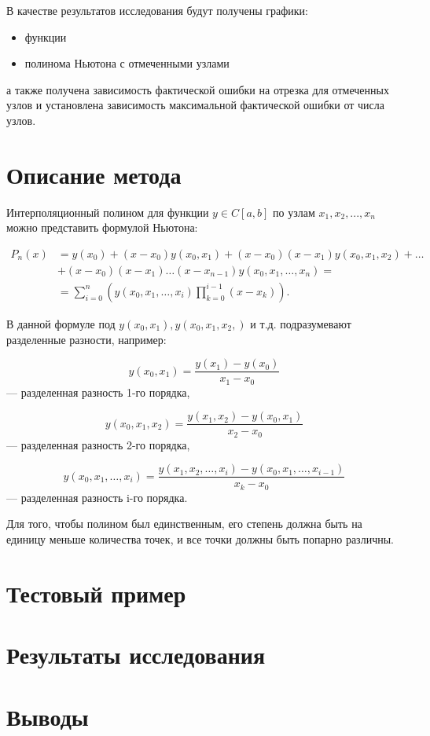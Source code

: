 \documentclass{article}
\begin{document}
В качестве результатов исследования будут получены графики:
\begin{itemize}[label=$\cdot$]
    \item функции
    \item полинома Ньютона с отмеченными узлами
\end{itemize}
а также получена зависимость фактической ошибки на отрезка для отмеченных узлов и установлена зависимость максимальной фактической ошибки от числа узлов.

\section{Описание метода}

Интерполяционный полином для функции $y \in C[a, b]$ по узлам
$x_1, x_2, ... ,\allowbreak x_n$ можно представить формулой Ньютона:

\begin{equation}
\begin{split}
P_n(x) &= y(x_0) + (x - x_0) y(x_0, x_1) + (x - x_0)(x - x_1) y(x_0, x_1, x_2) + \dots \\
& + (x - x_0)(x - x_1) \dots (x - x_{n-1}) y(x_0, x_1, \dots, x_n) = \\
& = \sum_{i=0}^{n} (y(x_0, x_1, \dots, x_i) \prod_{k=0}^{i-1} (x - x_k)).
\end{split}
\end{equation}

В данной формуле под $y(x_0,x_1), y(x_0,x_1,x_2,)$ и т.д. подразумевают разделенные разности, например:

\begin{equation}
y(x_0,x_1) = \frac{y(x_1) - y(x_0)}{x_1-x_0}
\end{equation} --- разделенная разность 1-го порядка,

\begin{equation}
y(x_0,x_1,x_2) = \frac{y(x_1,x_2) - y(x_0,x_1)}{x_2-x_0}
\end{equation} --- разделенная разность 2-го порядка,

\begin{equation}
y(x_0,x_1,\dots,x_i) = \frac{y(x_1,x_2,\dots,x_i) - y(x_0,x_1,\dots,x_{i-1})}{x_k-x_0}
\end{equation} --- разделенная разность i-го порядка.

Для того, чтобы полином был единственным, его степень должна быть на
единицу меньше количества точек, и все точки должны быть попарно различны.

\section{Тестовый пример}

\section{Результаты исследования}

\section{Выводы}
\end{document}
